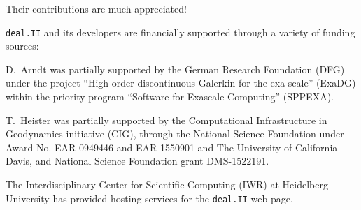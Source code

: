 \documentclass{ansarticle-preprint}
\newcommand{\specialword}[1]{\texttt{#1}}
\newcommand{\dealii}{{\specialword{deal.II}}}
\begin{document}
Their contributions are much appreciated!


\bigskip

\dealii{} and its developers are financially supported through a
variety of funding sources:

D.~Arndt was partially supported by the German Research Foundation (DFG) under the
project ``High-order discontinuous Galerkin for the exa-scale'' (ExaDG) within the
priority program ``Software for Exascale Computing'' (SPPEXA).
 
% 

T.~Heister was partially supported by the Computational Infrastructure in
Geodynamics initiative (CIG), through the National Science Foundation
under Award No. EAR-0949446 and EAR-1550901 and The University of California -- Davis, and National Science Foundation grant DMS-1522191.
% 
% 
% 
% 
% 

The Interdisciplinary Center for Scientific Computing (IWR) at Heidelberg University has provided
hosting services for the \dealii{} web page.


{}

\end{document}
